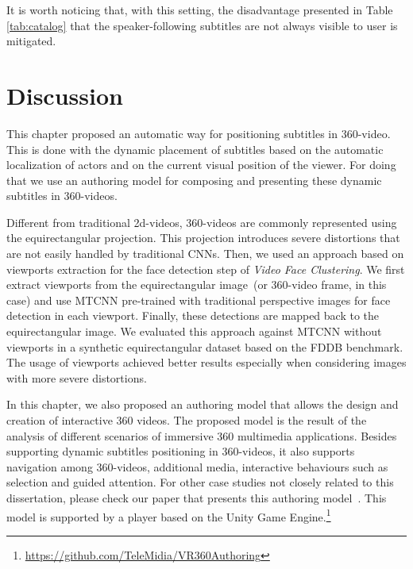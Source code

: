 It is worth noticing that, with this setting, the disadvantage presented in Table \ref{tab:catalog} that the speaker-following subtitles are not always visible to user is mitigated.

\section{Discussion}

This chapter proposed an automatic way for positioning subtitles in 360-video. This is done with the dynamic placement of subtitles based on the automatic localization of actors and on the current visual position of the viewer. For doing that we use an authoring model for composing and presenting these dynamic subtitles in 360-videos.

Different from traditional 2d-videos, 360-videos are commonly represented using the equirectangular projection. This projection introduces severe distortions that are not easily handled by traditional CNNs. Then, we used an approach based on viewports extraction for the face detection step of \emph{Video Face Clustering}. We first extract viewports from the equirectangular image~(or 360-video frame, in this case) and use MTCNN pre-trained with traditional perspective images for face detection in each viewport. Finally, these detections are mapped back to the equirectangular image. We evaluated this approach against MTCNN without viewports in a synthetic equirectangular dataset based on the FDDB benchmark. The usage of viewports achieved better results especially when considering images with more severe distortions.

In this chapter, we also proposed an authoring model that allows the design and creation of interactive 360 videos. The proposed model is the result of the analysis of different scenarios of immersive 360 multimedia applications. Besides supporting dynamic subtitles positioning in 360-videos, it also supports navigation among 360-videos, additional media, interactive behaviours such as selection and guided attention. For other case studies not closely related to this dissertation, please check our paper that presents this authoring model~\cite{mendes2020authoring}. This model is supported by a player based on the Unity Game Engine.\footnote{\url{https://github.com/TeleMidia/VR360Authoring}}

